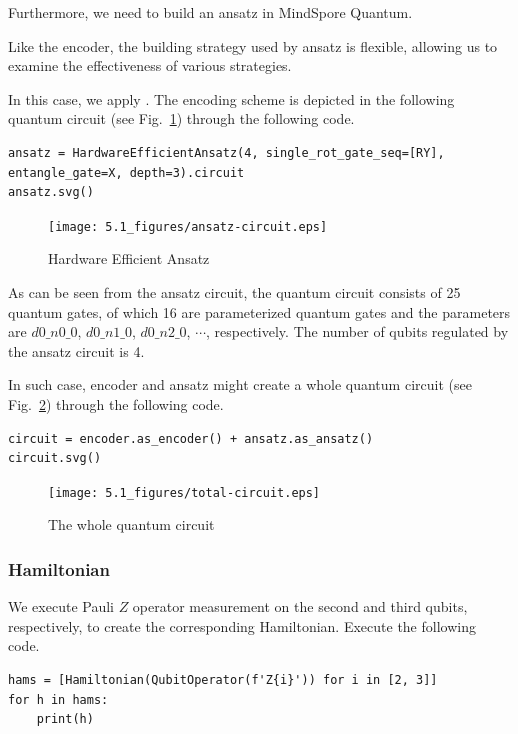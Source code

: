 Furthermore, we need to build an ansatz in MindSpore Quantum.

Like the encoder, the building strategy used by ansatz is flexible, allowing us to examine the effectiveness of various strategies.

In this case, we apply \HardwareEfficientAnsatz. The encoding scheme is depicted in the following quantum circuit (see Fig.~\ref{5.1ansatz-circuit}) through the following code.

\begin{lstlisting}
ansatz = HardwareEfficientAnsatz(4, single_rot_gate_seq=[RY], entangle_gate=X, depth=3).circuit
ansatz.svg()
\end{lstlisting}

\begin{figure}[H]
    \centering
    \texttt{[image: 5.1\_figures/ansatz-circuit.eps]}
    \caption{Hardware Efficient Ansatz}
    \label{5.1ansatz-circuit}
\end{figure}

As can be seen from the ansatz circuit, the quantum circuit consists of 25 quantum gates, of which 16 are parameterized quantum gates and the parameters are $d0\_n0\_0$, $d0\_n1\_0$, $d0\_n2\_0$, $\cdots$,  respectively. The number of qubits regulated by the ansatz circuit is 4.

In such case, encoder and ansatz might create a whole quantum circuit (see Fig.~\ref{5.1total-circuit}) through the following code.

\begin{lstlisting}
circuit = encoder.as_encoder() + ansatz.as_ansatz()
circuit.svg()
\end{lstlisting}

\begin{figure}[H]
    \centering
    \texttt{[image: 5.1\_figures/total-circuit.eps]}
    \caption{The whole quantum circuit}
    \label{5.1total-circuit}
\end{figure}

\subsubsection{Hamiltonian}
We execute Pauli $Z$ operator measurement on the second and third qubits, respectively, to create the corresponding Hamiltonian. Execute the following code.

\begin{lstlisting}
hams = [Hamiltonian(QubitOperator(f'Z{i}')) for i in [2, 3]]
for h in hams:
    print(h)
\end{lstlisting}


